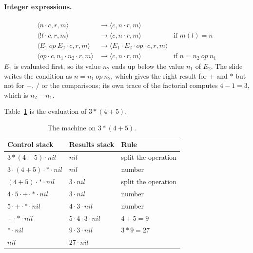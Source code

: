 \paragraph{Integer expressions.}
\[
\begin{array}{lll}
\langle n \cdot c, r, m \rangle & \to \langle c, n \cdot r, m \rangle \\
\langle !l \cdot c, r, m \rangle & \to \langle c, n \cdot r, m \rangle & \text{if } m(l) = n \\
\langle E_1\ \mathit{op}\ E_2 \cdot c, r, m \rangle & \to \langle E_1 \cdot E_2 \cdot \mathit{op} \cdot c, r, m \rangle \\
\langle \mathit{op} \cdot c, n_1 \cdot n_2 \cdot r, m \rangle & \to \langle c, n \cdot r, m \rangle & \text{if } n = n_2\ \mathit{op}\ n_1
\end{array}
\]
$E_1$ is evaluated first, so its value $n_2$ ends up below the value $n_1$ of
$E_2$. The slide writes the condition as $n = n_1\ \mathit{op}\ n_2$, which gives
the right result for $+$ and $*$ but not for $-$, $/$ or the comparisons; its
own trace of the factorial computes $4 - 1 = 3$, which is $n_2 - n_1$.

Table~\ref{tab:machine-expr} is the evaluation of $3 * (4 + 5)$.

\begin{table}[h]
\centering
\small
\begin{tabular}{l l l}
  \toprule
  Control stack & Results stack & Rule \\
  \midrule
  $3 * (4 + 5) \cdot \mathit{nil}$       & $\mathit{nil}$          & split the operation \\
  $3 \cdot (4 + 5) \cdot * \cdot \mathit{nil}$ & $\mathit{nil}$     & number \\
  $(4 + 5) \cdot * \cdot \mathit{nil}$   & $3 \cdot \mathit{nil}$  & split the operation \\
  $4 \cdot 5 \cdot + \cdot * \cdot \mathit{nil}$ & $3 \cdot \mathit{nil}$ & number \\
  $5 \cdot + \cdot * \cdot \mathit{nil}$ & $4 \cdot 3 \cdot \mathit{nil}$ & number \\
  $+ \cdot * \cdot \mathit{nil}$         & $5 \cdot 4 \cdot 3 \cdot \mathit{nil}$ & $4 + 5 = 9$ \\
  $* \cdot \mathit{nil}$                 & $9 \cdot 3 \cdot \mathit{nil}$ & $3 * 9 = 27$ \\
  $\mathit{nil}$                         & $27 \cdot \mathit{nil}$ & \\
  \bottomrule
\end{tabular}
\caption{The machine on $3 * (4 + 5)$.}
\label{tab:machine-expr}
\end{table}

